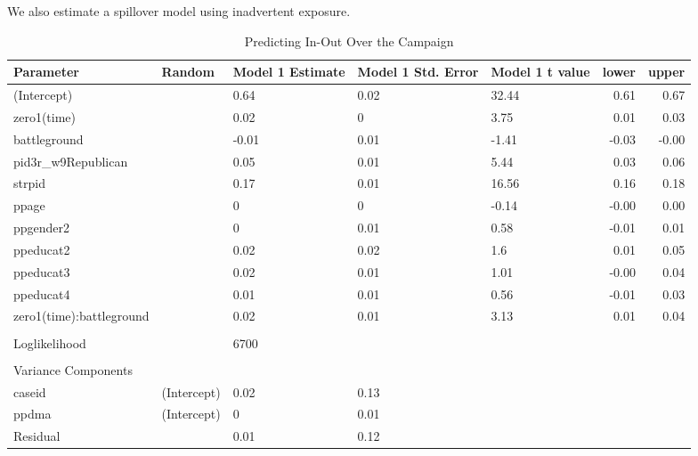 \documentclass[doc,fignum,noapacite]{apa}
\begin{document}
We also estimate a spillover model using inadvertent exposure. 
\scriptsize
\begin{table}[ht]
\begin{center}
\caption{Predicting In-Out Over the Campaign}
\begin{tabular}{lllllrr}
  \hline
Parameter & Random & Model 1 Estimate & Model 1 Std. Error & Model 1 t value & lower & upper \\ 
  \hline
(Intercept) &  & 0.64 & 0.02 & 32.44 & 0.61 & 0.67 \\ 
  zero1(time) &  & 0.02 & 0 & 3.75 & 0.01 & 0.03 \\ 
  battleground &  & -0.01 & 0.01 & -1.41 & -0.03 & -0.00 \\ 
  pid3r\_w9Republican &  & 0.05 & 0.01 & 5.44 & 0.03 & 0.06 \\ 
  strpid &  & 0.17 & 0.01 & 16.56 & 0.16 & 0.18 \\ 
  ppage &  & 0 & 0 & -0.14 & -0.00 & 0.00 \\ 
  ppgender2 &  & 0 & 0.01 & 0.58 & -0.01 & 0.01 \\ 
  ppeducat2 &  & 0.02 & 0.02 & 1.6 & 0.01 & 0.05 \\ 
  ppeducat3 &  & 0.02 & 0.01 & 1.01 & -0.00 & 0.04 \\ 
  ppeducat4 &  & 0.01 & 0.01 & 0.56 & -0.01 & 0.03 \\ 
  zero1(time):battleground &  & 0.02 & 0.01 & 3.13 & 0.01 & 0.04 \\ 
   &  &  &  &  &  &  \\ 
  Loglikelihood &  & 6700 &  &  &  &  \\ 
   &  &  &  &  &  &  \\ 
  Variance Components &  &  &  &  &  &  \\ 
  caseid & (Intercept) & 0.02 & 0.13 &  &  &  \\ 
  ppdma & (Intercept) & 0 & 0.01 &  &  &  \\ 
  Residual &  & 0.01 & 0.12 &  &  &  \\ 
   \hline
\end{tabular}
\end{center}
\end{table}\normalsize
\end{document}
